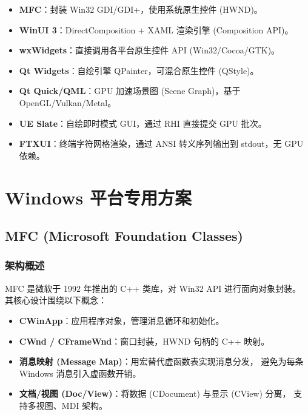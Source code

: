 \documentclass[12pt,a4paper,fontset=fandol]{ctexbook}
\begin{document}
\begin{compare}[title=渲染方式对比]
\begin{itemize}
  \item \textbf{MFC}：封装 Win32 GDI/GDI+，使用系统原生控件 (HWND)。
  \item \textbf{WinUI 3}：DirectComposition + XAML 渲染引擎 (Composition API)。
  \item \textbf{wxWidgets}：直接调用各平台原生控件 API (Win32/Cocoa/GTK)。
  \item \textbf{Qt Widgets}：自绘引擎 QPainter，可混合原生控件 (QStyle)。
  \item \textbf{Qt Quick/QML}：GPU 加速场景图 (Scene Graph)，基于 OpenGL/\allowbreak{}\allowbreak{}Vulkan/\allowbreak{}\allowbreak{}Metal。
  \item \textbf{UE Slate}：自绘即时模式 GUI，通过 RHI 直接提交 GPU 批次。
  \item \textbf{FTXUI}：终端字符网格渲染，通过 ANSI 转义序列输出到 stdout，无 GPU 依赖。
\end{itemize}
\end{compare}

\part{Windows 平台专用方案}

\chapter{MFC (Microsoft Foundation Classes)}

\section{架构概述}

MFC 是微软于 1992 年推出的 C++ 类库，对 Win32 API 进行面向对象封装。
其核心设计围绕以下概念：

\begin{itemize}
  \item \textbf{CWinApp}：应用程序对象，管理消息循环和初始化。
  \item \textbf{CWnd / CFrameWnd}：窗口封装，HWND 句柄的 C++ 映射。
  \item \textbf{消息映射 (Message Map)}：用宏替代虚函数表实现消息分发，
        避免为每条 Windows 消息引入虚函数开销。
  \item \textbf{文档/视图 (Doc/View)}：将数据 (CDocument) 与显示 (CView) 分离，
        支持多视图、MDI 架构。
\end{itemize}
\end{document}
